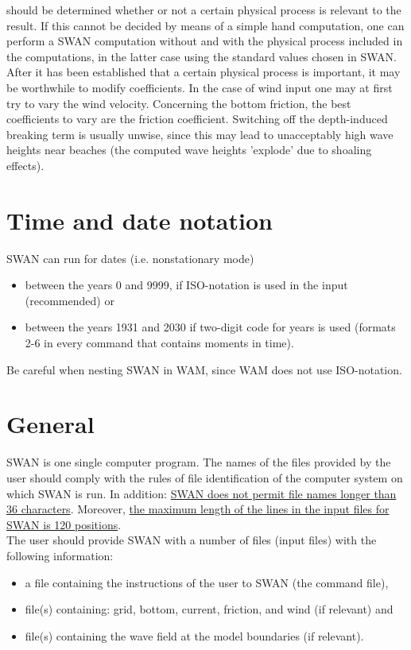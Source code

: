 \documentclass[12pt]{book}
\begin{document}
should be determined whether or not a certain physical process is relevant to the result. If this cannot be
decided by means of a simple hand computation, one can perform a SWAN computation without and with
the physical process included in the computations, in the latter case using the standard values chosen
in SWAN.
\\[2ex]
\noindent
After it has been established that a certain physical process is important, it may be worthwhile to modify
coefficients. In the case of wind input one may at first try to vary the wind velocity. Concerning the bottom
friction, the best coefficients to vary are the friction coefficient. Switching off the depth-induced breaking
term is usually unwise, since this may lead to unacceptably high wave heights near beaches (the
computed wave heights 'explode' due to shoaling effects).

\section{Time and date notation}
SWAN can run for dates (i.e. nonstationary mode)
\begin{itemize}
  \item between the years 0 and 9999, if ISO-notation is used in the input (recommended) or
  \item between the years 1931 and 2030 if two-digit code for years is used (formats 2-6 in every
        command that contains moments in time).
\end{itemize}
Be careful when nesting SWAN in WAM, since WAM does not use ISO-notation.

 \label{ch:inout}

\section{General}

SWAN is one single computer program. The names of the files provided by the user should comply with
the rules of file identification of the computer system on which SWAN is run. In addition: \underline{SWAN does not
permit file names longer than 36 characters}. Moreover, \underline{the maximum length of the lines in the input files
for SWAN is 120 positions}.
\\[2ex]
\noindent
The user should provide SWAN with a number of files (input files) with the following information:
\begin{itemize}
  \item a file containing the instructions of the user to SWAN (the command file),
  \item file(s) containing: grid, bottom, current, friction, and wind (if relevant) and
  \item file(s) containing the wave field at the model boundaries (if relevant).
\end{itemize}
\end{document}
